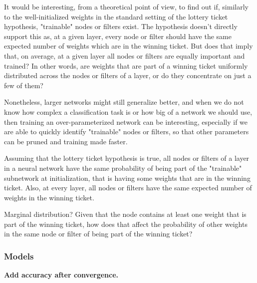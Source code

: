 It would be interesting, from a theoretical point of view, to find out if, similarly to the well-initialized weights in the standard setting of the lottery ticket hypothesis, "trainable" nodes or filters exist. The hypothesis doesn't directly support this as, at a given layer, every node or filter should have the same expected number of weights which are in the winning ticket. But does that imply that, on average, at a given layer all nodes or filters are equally important and trained? In other words, are weights that are part of a winning ticket uniformly distributed across the nodes or filters of a layer, or do they concentrate on just a few of them?

Nonetheless, larger networks might still generalize better, and when we do not know how complex a classification task is or how big of a network we should use, then training an over-parameterized network can be interesting, especially if we are able to quickly identify "trainable" nodes or filters, so that other parameters can be pruned and training made faster. 

Assuming that the lottery ticket hypothesis is true, all nodes or filters of a layer in a neural network have the same probability of being part of the "trainable" subnetwork at initialization, that is having some weights that are in the winning ticket. Also, at every layer, all nodes or filters have the same expected number of weights in the winning ticket. 

Marginal distribution? Given that the node contains at least one weight that is part of the winning ticket, how does that affect the probability of other weights in the same node or filter of being part of the winning ticket?

\subsubsection*{Models}

\textbf{Add accuracy after convergence.}

